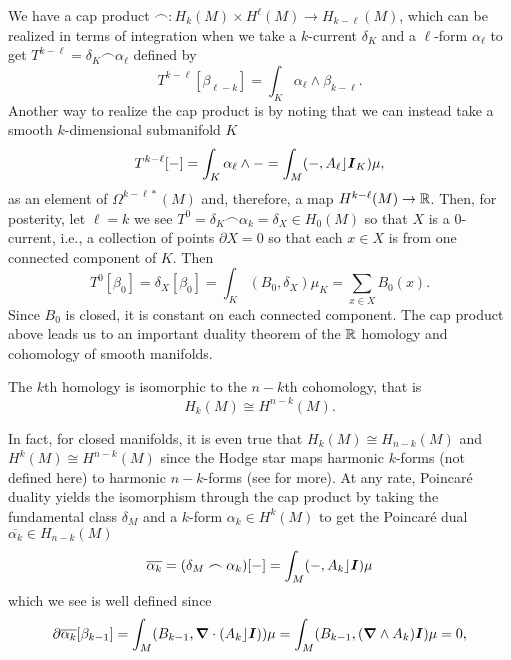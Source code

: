 \documentclass{article}
\begin{document}
We have a cap product $\frown \colon H_k(M)\times H^\ell(M) \to H_{k-\ell}(M)$, which can be realized in terms of integration when we take a $k$-current $\delta_K$ and a $\ell$-form $\alpha_\ell$ to get $T^{k-\ell} = \delta_K \frown  \alpha_\ell$ defined by
\begin{equation}
T^{k-\ell}[\beta_{\ell - k}] = \int_{K} \alpha_\ell \wedge \beta_{k-\ell}.
\end{equation}
Another way to realize the cap product is by noting that we can instead take a smooth $k$-dimensional submanifold $K$
\begin{equation}
T^{k-\ell}[-] = \int_K \alpha_\ell \wedge - = \int_M (-,A_\ell \rfloor \boldsymbol{I}_K) \mu,
\end{equation}
as an element of $\Omega^{k-\ell*}(M)$ and, therefore, a map $H^{k-\ell}(M)\to \mathbb{R}$. Then, for posterity, let $\ell = k$ we see $T^0 = \delta_K \frown \alpha_k = \delta_{X} \in H_0(M)$ so that $X$ is a $0$-current, i.e., a collection of points $\partial X = 0$ so that each $x\in X$ is from one connected component of $K$. Then
\begin{equation}
T^0[\beta_0] = \delta_{X}[\beta_0] = \int_{K} (B_0 , \delta_X ) \mu_{K} = \sum_{x\in X} B_0(x).
\end{equation}
Since $B_0$ is closed, it is constant on each connected component. The cap product above leads us to an important duality theorem of the $\mathbb{R}$ homology and cohomology of smooth manifolds.
\begin{theorem}
    The $k$th homology is isomorphic to the $n-k$th cohomology, that is 
\begin{equation}
H_k(M) \cong H^{n-k}(M).
\end{equation}
\end{theorem}
In fact, for closed manifolds, it is even true that $H_k(M)\cong H_{n-k}(M)$ and $H^k(M)\cong H^{n-k}(M)$ since the Hodge star maps harmonic $k$-forms (not defined here) to harmonic $n-k$-forms (see \cite{cappell_cohomology_2006} for more). At any rate, Poincar\'e duality yields the isomorphism through the cap product by taking the fundamental class $\delta_M$ and a $k$-form $\alpha_k \in H^k(M)$ to get the Poincar\'e dual $\overline{\alpha_k} \in H_{n-k}(M)$
\begin{equation}
\overline{\alpha_k} = (\delta_M \frown \alpha_k)[-] = \int_M (-,A_k \rfloor \boldsymbol{I})\mu
\end{equation}
which we see is well defined since
\begin{align}
\partial \overline{\alpha_k}[\beta_{k-1}] = \int_M (B_{k-1}, \boldsymbol{\nabla} \cdot (A_k \rfloor \boldsymbol{I}))\mu = \int_M (B_{k-1},(\boldsymbol{\nabla} \wedge A_k)\boldsymbol{I}) \mu =0,
\end{align}
\end{document}
